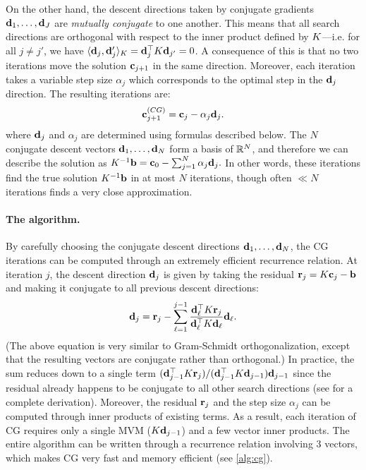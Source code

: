 On the other hand, the descent directions taken by conjugate gradients $\mathbf{d}_1, \ldots, \mathbf{d}_J$ are \emph{mutually conjugate} to one another.
This means that all search directions are orthogonal with respect to the inner product defined by $K$---i.e. for all $j \ne j'$, we have $\langle \mathbf{d}_j, \mathbf{d}_j' \rangle_{K} = \mathbf{d}_j^\top K \mathbf{d}_{j'} = 0$.
A consequence of this is that no two iterations move the solution $\mathbf{c}_{j+1}$ in the same direction.
Moreover, each iteration takes a variable step size $\alpha_j$ which corresponds to the optimal step in the $\mathbf{d}_j$ direction.
The resulting iterations are:
%
\begin{equation*}
  \mathbf{c}_{j+1}^{\text(CG)} = \mathbf{c}_{j} - \alpha_j \mathbf{d}_{j}.
\end{equation*}
%
where $\mathbf{d}_j$ and $\alpha_j$ are determined using formulas described below.
The $N$ conjugate descent vectors $\mathbf{d}_1, \ldots, \mathbf{d}_N$ form a basis of $\mathbb{R}^N$, and therefore we can describe the solution as $K^{-1} \mathbf{b} = \mathbf{c}_0 - \sum_{j=1}^N \alpha_j \mathbf{d}_j.$
In other words, these iterations find the true solution $K^{-1} \mathbf{b}$ in at most $N$ iterations, though often $\ll N$ iterations finds a very close approximation.

\paragraph{The algorithm.}
By carefully choosing the conjugate descent directions $\mathbf{d}_1, \ldots, \mathbf{d}_N$, the CG iterations can be computed through an extremely efficient recurrence relation.
At iteration $j$, the descent direction $\mathbf{d}_j$ is given by taking the residual $\mathbf{r}_j = K \mathbf{c}_{j} - \mathbf{b}$ and making it conjugate to all previous descent directions:
%
\begin{equation*}
  \mathbf{d}_j = \mathbf{r}_j - \sum_{\ell = 1}^{j-1} \frac{ \mathbf{d}_\ell^\top K \mathbf{r}_j }{ \mathbf{d}_\ell^\top K \mathbf{d}_\ell } \mathbf{d}_\ell.
\end{equation*}
%
(The above equation is very similar to Gram-Schmidt orthogonalization, except that the resulting vectors are conjugate rather than orthogonal.)
In practice, the sum reduces down to a single term $( \mathbf{d}_{j-1}^\top K \mathbf{r}_j ) / ( \mathbf{d}_{j-1}^\top K \mathbf{d}_{j-1} ) \mathbf{d}_{j-1}$ since the residual already happens to be conjugate to all other search directions (see \citep[Sec. 7-8]{shewchuk1994introduction} for a complete derivation).
Moreover, the residual $\mathbf{r}_j$ and the step size $\alpha_j$ can be computed through inner products of existing terms.
As a result, each iteration of CG requires only a single MVM ($K \mathbf{d}_{j-1}$) and a few vector inner products.
The entire algorithm can be written through a recurrence relation involving 3 vectors, which makes CG very fast and memory efficient (see \cref{alg:cg}).

